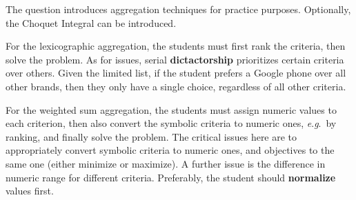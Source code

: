 \documentclass[10pt, UKenglish]{exam}
\begin{document}
\begin{questions}
	
	\begin{comments}
		The question introduces aggregation techniques for practice
		purposes. Optionally, the Choquet Integral can be introduced. 

		For the lexicographic aggregation, the students must first rank
		the criteria, then solve the problem. As for issues, serial
		\textbf{dictactorship} prioritizes certain criteria over
		others. Given the limited list, if the student prefers a Google
		phone over all other brands, then they only have a single
		choice, regardless of all other criteria.

		For the weighted sum aggregation, the students must assign
		numeric values to each criterion, then also convert the
		symbolic criteria to numeric ones, \textit{e}.\textit{g}.\ by
		ranking, and finally solve the problem. The critical issues
		here are to appropriately convert symbolic criteria to numeric
		ones, and objectives to the same one (either minimize or
		maximize). A further issue is the difference in numeric range
		for different criteria. Preferably, the student should
		\textbf{normalize} values first.
	\end{comments}
	
\end{questions}
\end{document}
